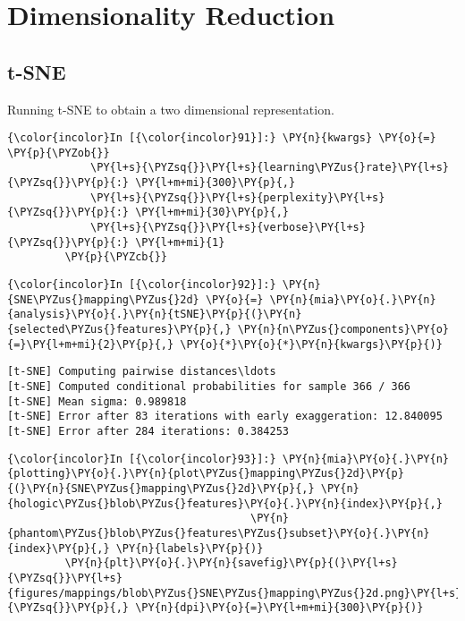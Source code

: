     \section{Dimensionality Reduction}\label{dimensionality-reduction}

\subsection{t-SNE}\label{t-sne}

Running t-SNE to obtain a two dimensional representation.

    \begin{Verbatim}[commandchars=\\\{\}]
{\color{incolor}In [{\color{incolor}91}]:} \PY{n}{kwargs} \PY{o}{=} \PY{p}{\PYZob{}}
             \PY{l+s}{\PYZsq{}}\PY{l+s}{learning\PYZus{}rate}\PY{l+s}{\PYZsq{}}\PY{p}{:} \PY{l+m+mi}{300}\PY{p}{,}
             \PY{l+s}{\PYZsq{}}\PY{l+s}{perplexity}\PY{l+s}{\PYZsq{}}\PY{p}{:} \PY{l+m+mi}{30}\PY{p}{,}
             \PY{l+s}{\PYZsq{}}\PY{l+s}{verbose}\PY{l+s}{\PYZsq{}}\PY{p}{:} \PY{l+m+mi}{1}
         \PY{p}{\PYZcb{}}
\end{Verbatim}

    \begin{Verbatim}[commandchars=\\\{\}]
{\color{incolor}In [{\color{incolor}92}]:} \PY{n}{SNE\PYZus{}mapping\PYZus{}2d} \PY{o}{=} \PY{n}{mia}\PY{o}{.}\PY{n}{analysis}\PY{o}{.}\PY{n}{tSNE}\PY{p}{(}\PY{n}{selected\PYZus{}features}\PY{p}{,} \PY{n}{n\PYZus{}components}\PY{o}{=}\PY{l+m+mi}{2}\PY{p}{,} \PY{o}{*}\PY{o}{*}\PY{n}{kwargs}\PY{p}{)}
\end{Verbatim}

    \begin{Verbatim}[commandchars=\\\{\}]
[t-SNE] Computing pairwise distances\ldots
[t-SNE] Computed conditional probabilities for sample 366 / 366
[t-SNE] Mean sigma: 0.989818
[t-SNE] Error after 83 iterations with early exaggeration: 12.840095
[t-SNE] Error after 284 iterations: 0.384253
    \end{Verbatim}

    \begin{Verbatim}[commandchars=\\\{\}]
{\color{incolor}In [{\color{incolor}93}]:} \PY{n}{mia}\PY{o}{.}\PY{n}{plotting}\PY{o}{.}\PY{n}{plot\PYZus{}mapping\PYZus{}2d}\PY{p}{(}\PY{n}{SNE\PYZus{}mapping\PYZus{}2d}\PY{p}{,} \PY{n}{hologic\PYZus{}blob\PYZus{}features}\PY{o}{.}\PY{n}{index}\PY{p}{,}
                                      \PY{n}{phantom\PYZus{}blob\PYZus{}features\PYZus{}subset}\PY{o}{.}\PY{n}{index}\PY{p}{,} \PY{n}{labels}\PY{p}{)}
         \PY{n}{plt}\PY{o}{.}\PY{n}{savefig}\PY{p}{(}\PY{l+s}{\PYZsq{}}\PY{l+s}{figures/mappings/blob\PYZus{}SNE\PYZus{}mapping\PYZus{}2d.png}\PY{l+s}{\PYZsq{}}\PY{p}{,} \PY{n}{dpi}\PY{o}{=}\PY{l+m+mi}{300}\PY{p}{)}
\end{Verbatim}

